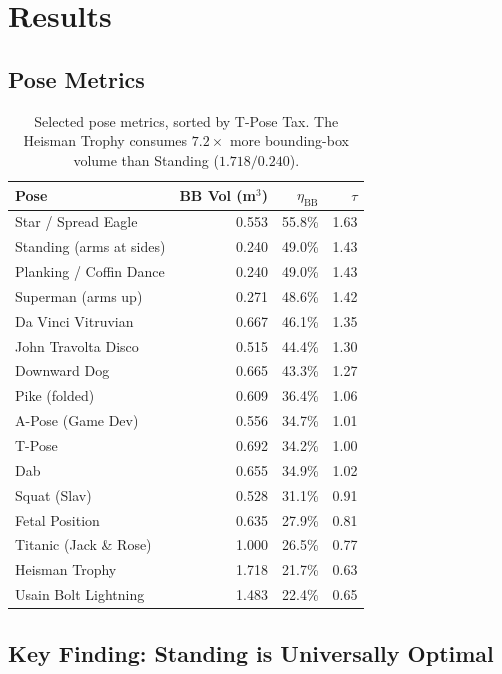\documentclass[11pt,letterpaper]{article}
\begin{document}
\section{Results}

\subsection{Pose Metrics}

\begin{table}[H]
\centering
\small
\begin{tabular}{lrrr}
\toprule
\textbf{Pose} & \textbf{BB Vol (m$^3$)} & \textbf{$\eta_{\text{BB}}$} & \textbf{$\tau$} \\
\midrule
Star / Spread Eagle & 0.553 & 55.8\% & 1.63 \\
Standing (arms at sides) & 0.240 & 49.0\% & 1.43 \\
Planking / Coffin Dance & 0.240 & 49.0\% & 1.43 \\
Superman (arms up) & 0.271 & 48.6\% & 1.42 \\
Da Vinci Vitruvian & 0.667 & 46.1\% & 1.35 \\
John Travolta Disco & 0.515 & 44.4\% & 1.30 \\
Downward Dog & 0.665 & 43.3\% & 1.27 \\
Pike (folded) & 0.609 & 36.4\% & 1.06 \\
A-Pose (Game Dev) & 0.556 & 34.7\% & 1.01 \\
T-Pose & 0.692 & 34.2\% & 1.00 \\
Dab & 0.655 & 34.9\% & 1.02 \\
Squat (Slav) & 0.528 & 31.1\% & 0.91 \\
Fetal Position & 0.635 & 27.9\% & 0.81 \\
Titanic (Jack \& Rose) & 1.000 & 26.5\% & 0.77 \\
Heisman Trophy & 1.718 & 21.7\% & 0.63 \\
Usain Bolt Lightning & 1.483 & 22.4\% & 0.65 \\
\bottomrule
\end{tabular}
\caption{Selected pose metrics, sorted by T-Pose Tax. The Heisman Trophy consumes $7.2\times$ more bounding-box volume than Standing ($1.718/0.240$).}
\label{tab:metrics}
\end{table}

\subsection{Key Finding: Standing is Universally Optimal}
\end{document}
